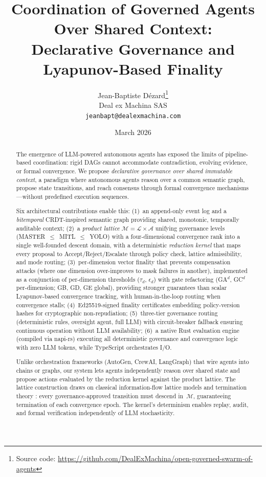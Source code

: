 \documentclass[11pt]{article}
\title{Coordination of Governed Agents Over Shared Context:\\Declarative Governance and Lyapunov-Based Finality}
\author{
  Jean-Baptiste D\'ezard\thanks{Source code: \url{https://github.com/DealExMachina/open-governed-swarm-of-agents}}\\
  Deal ex Machina SAS\\
  \texttt{jeanbapt@dealexmachina.com}
}
\date{March 2026}
\begin{document}
\maketitle

\begin{abstract}
The emergence of LLM-powered autonomous agents has exposed the limits of pipeline-based coordination: rigid DAGs cannot accommodate contradiction, evolving evidence, or formal convergence. We propose \emph{declarative governance over shared immutable context}, a paradigm where autonomous agents reason over a common semantic graph, propose state transitions, and reach consensus through formal convergence mechanisms---without predefined execution sequences.

Six architectural contributions enable this: (1)~an append-only event log and a \emph{bitemporal} CRDT-inspired semantic graph providing shared, monotonic, temporally auditable context; (2)~a \emph{product lattice} $\mathcal{M} = \mathcal{L} \times \mathcal{A}$ unifying governance levels (MASTER~$\leq$~MITL~$\leq$~YOLO) with a four-dimensional convergence rank into a single well-founded descent domain, with a deterministic \emph{reduction kernel} that maps every proposal to Accept/Reject/Escalate through policy check, lattice admissibility, and mode routing; (3)~per-dimension vector finality that prevents compensation attacks (where one dimension over-improves to mask failures in another), implemented as a conjunction of per-dimension thresholds ($\tau_d$, $\epsilon_d$) with gate refactoring (GA$^d$, GC$^d$ per-dimension; GB, GD, GE global), providing stronger guarantees than scalar Lyapunov-based convergence tracking, with human-in-the-loop routing when convergence stalls; (4)~Ed25519-signed finality certificates embedding policy-version hashes for cryptographic non-repudiation; (5)~three-tier governance routing (deterministic rules, oversight agent, full LLM) with circuit-breaker fallback ensuring continuous operation without LLM availability; (6)~a native Rust evaluation engine (compiled via napi-rs) executing all deterministic governance and convergence logic with zero LLM tokens, while TypeScript orchestrates I/O.

Unlike orchestration frameworks (AutoGen, CrewAI, LangGraph) that wire agents into chains or graphs, our system lets agents independently reason over shared state and propose actions evaluated by the reduction kernel against the product lattice. The lattice construction draws on classical information-flow lattice models \cite{denning1976} and termination theory \cite{baader1998}: every governance-approved transition must descend in~$\mathcal{M}$, guaranteeing termination of each convergence epoch. The kernel's determinism enables replay, audit, and formal verification independently of LLM stochasticity.


\end{abstract}
\end{document}
